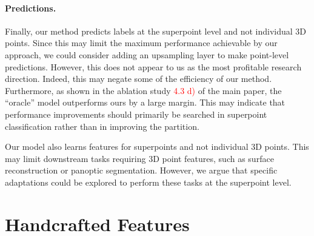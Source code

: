 \paragraph{Predictions.}
Finally, our method predicts labels at the superpoint level  and not individual 3D points. 
Since this may limit the maximum performance achievable by our approach, we could consider adding an upsampling layer to make point-level predictions. However, this does not appear to us as the most profitable research direction. Indeed, this may negate some of the efficiency of our method. Furthermore, as shown in the ablation study \textcolor{red}{4.3 d)} of the main paper, the ``oracle'' model outperforms ours by a large margin. This may indicate that performance improvements should primarily be searched in superpoint classification rather than in improving the partition.

Our model also learns features for superpoints and not individual 3D points. This may limit downstream tasks requiring 3D point features, such as surface reconstruction or panoptic segmentation.
However, we argue that specific adaptations could be explored to perform these tasks at the superpoint level.

\section{Handcrafted Features}
\label{sec:hf}

